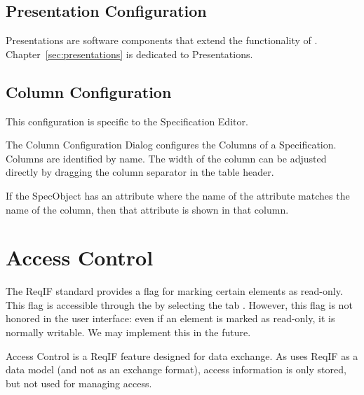 \subsection{Presentation Configuration}
\label{sec:presentation_configuration}

Presentations are software components that extend the functionality of \pror{}.  Chapter~\ref{sec:presentations} is dedicated to Presentations.

\subsection{Column Configuration}
\label{sec:column_configuration}

This configuration is specific to the Specification Editor.

The Column Configuration Dialog configures the Columns of a
Specification.  Columns are identified by name.  The width of the column
can be adjusted directly by dragging the column separator in the table
header.

If the SpecObject has an attribute where the name of the attribute
matches the name of the column, then that attribute is shown in that
column.

\section{Access Control}

The ReqIF standard provides a flag for marking certain elements as read-only.  This flag is accessible through the  by selecting the tab .  However, this flag is not honored in the user interface: even if an element is marked as read-only, it is normally writable.  We may implement this in the future.

\begin{warning}
Access Control is a ReqIF feature designed for data exchange.  As \pror{} uses ReqIF as a data model (and not as an exchange format), access information is only stored, but not used for managing access.
\end{warning}


